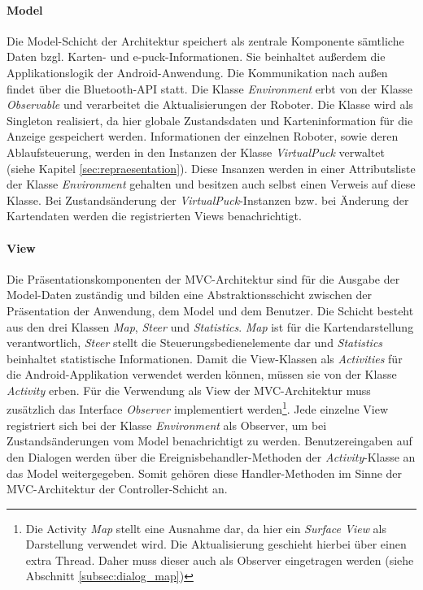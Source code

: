 \documentclass[10pt,a4paper]{article}
\begin{document}
			\paragraph*{Model}
  				Die Model-Schicht der Architektur speichert als zentrale Komponente sämtliche Daten bzgl. Karten- und e-puck-Informationen. 
  				Sie beinhaltet außerdem die Applikationslogik der Android-Anwendung. Die Kommunikation nach außen findet über die
  				Bluetooth-API statt. Die Klasse \textit{Environment} erbt von der Klasse \textit{Observable} und verarbeitet
  				die Aktualisierungen der Roboter. Die Klasse wird als Singleton realisiert, da hier globale Zustandsdaten und Karteninformation
  				für die Anzeige gespeichert werden. Informationen der einzelnen Roboter, sowie deren Ablaufsteuerung, werden in den Instanzen
  				der Klasse \textit{VirtualPuck} verwaltet (siehe Kapitel \ref{sec:repraesentation}). Diese Insanzen werden in einer Attributsliste der Klasse
  				\textit{Environment} gehalten und besitzen auch selbst einen Verweis auf diese Klasse. Bei Zustandsänderung der \textit{VirtualPuck}-Instanzen
  				bzw. bei Änderung der Kartendaten werden die registrierten Views benachrichtigt.
  			\paragraph*{View}
  				Die Präsentationskomponenten der MVC-Architektur sind für die Ausgabe der Model-Daten zuständig und bilden eine
  				Abstraktionsschicht zwischen der Präsentation der Anwendung, dem Model und dem Benutzer. Die Schicht besteht aus den drei
  				Klassen	\textit{Map}, \textit{Steer} und \textit{Statistics}. \textit{Map} ist für die Kartendarstellung
  				verantwortlich, \textit{Steer} stellt die Steuerungsbedienelemente dar und \textit{Statistics} beinhaltet statistische
  				Informationen.  Damit die View-Klassen als \textit{Activities} für die Android-Applikation verwendet werden können, müssen sie
  				von der Klasse \textit{Activity} erben. Für die Verwendung als View der MVC-Architektur muss zusätzlich das Interface
  				\textit{Observer} implementiert werden\footnote{Die Activity \textit{Map} stellt eine Ausnahme dar, da hier ein \textit{Surface View} als
  				Darstellung verwendet wird. Die Aktualisierung geschieht hierbei über einen extra Thread. Daher muss dieser auch als Observer eingetragen
  				werden (siehe Abschnitt \ref{subsec:dialog_map})}. Jede einzelne View registriert sich bei der Klasse \textit{Environment} als Observer,
  				um bei Zustandsänderungen vom Model benachrichtigt zu werden. Benutzereingaben auf den Dialogen werden über
  				die Ereignisbehandler-Methoden der \textit{Activity}-Klasse an das Model weitergegeben. Somit gehören diese Handler-Methoden
  				im Sinne der MVC-Architektur der Controller-Schicht an.
\end{document}
